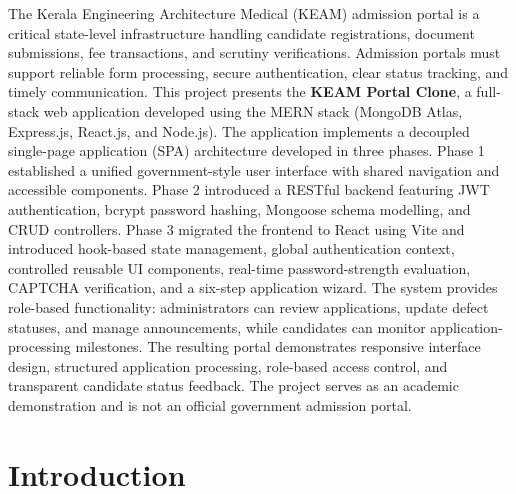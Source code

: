 \documentclass[12pt,a4paper,oneside]{report}
\begin{document}
The Kerala Engineering Architecture Medical (KEAM) admission portal is a critical state-level infrastructure handling candidate registrations, document submissions, fee transactions, and scrutiny verifications. Admission portals must support reliable form processing, secure authentication, clear status tracking, and timely communication. This project presents the \textbf{KEAM Portal Clone}, a full-stack web application developed using the MERN stack (MongoDB Atlas, Express.js, React.js, and Node.js). The application implements a decoupled single-page application (SPA) architecture developed in three phases. Phase 1 established a unified government-style user interface with shared navigation and accessible components. Phase 2 introduced a RESTful backend featuring JWT authentication, bcrypt password hashing, Mongoose schema modelling, and CRUD controllers. Phase 3 migrated the frontend to React using Vite and introduced hook-based state management, global authentication context, controlled reusable UI components, real-time password-strength evaluation, CAPTCHA verification, and a six-step application wizard. The system provides role-based functionality: administrators can review applications, update defect statuses, and manage announcements, while candidates can monitor application-processing milestones. The resulting portal demonstrates responsive interface design, structured application processing, role-based access control, and transparent candidate status feedback. The project serves as an academic demonstration and is not an official government admission portal.

\clearpage
{}
\setcounter{page}{1}
\tableofcontents

\clearpage
\listoffigures

\clearpage
\listoftables

\clearpage
{}
\setcounter{page}{1}

\chapter{Introduction}
\end{document}
